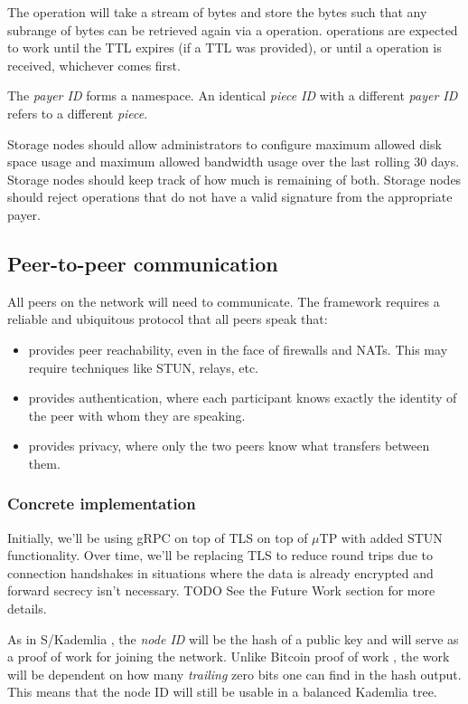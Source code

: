 \documentclass[a4paper,10pt]{article} \usepackage[utf8]{inputenc}
\newcommand{\todo}[1]{{\color{red} TODO #1}}
\begin{document}
The  operation will take a stream of bytes and store the bytes such
that any subrange of bytes can be retrieved again via a  operation.
 operations are expected to work until the TTL expires (if a TTL was
provided), or until a  operation is received, whichever comes
first.

The {\em payer ID} forms a namespace. An identical {\em piece ID} with a
different {\em payer ID} refers to a different {\em piece}.

Storage nodes should allow administrators to configure maximum allowed disk
space usage and maximum allowed bandwidth usage over the last rolling 30 days.
Storage nodes should keep track of how much is remaining of both. Storage nodes
should reject operations that do not have a valid signature from the appropriate
payer.

\subsection{Peer-to-peer communication}

All peers on the network will need to communicate. The framework requires a
reliable and ubiquitous protocol that all peers speak that:

\begin{itemize}
\item provides peer reachability, even in the face of firewalls
and NATs. This may require techniques like STUN, relays, etc.
\item provides authentication, where each participant knows
exactly the identity of the peer with whom they are speaking.
\item provides privacy, where only the two peers
know what transfers between them.
\end{itemize}

\subsubsection{Concrete implementation}

Initially, we'll be using gRPC \cite{grpc} on top of TLS on top of $\mu$TP
\cite{utp} with added STUN functionality. Over time, we'll be replacing TLS to
reduce round trips due to connection handshakes in situations where the data is
already encrypted and forward secrecy isn't necessary. \todo{} See the Future
Work section for more details.

As in S/Kademlia \cite{skad}, the {\em node ID} will be the hash of a public key
and will serve as a proof of work for joining the network. Unlike Bitcoin proof
of work \cite{bitcoin}, the work will be dependent on how many {\em trailing}
zero bits one can find in the hash output. This means that the node ID will
still be usable in a balanced Kademlia \cite{kad} tree.
\end{document}
